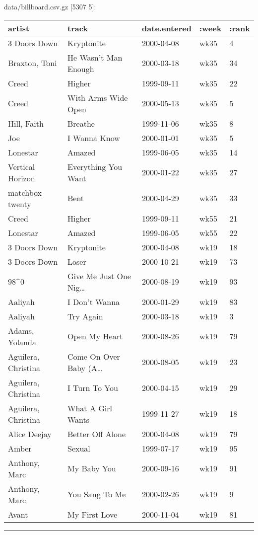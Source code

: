 \documentclass[]{article}
\newenvironment{Shaded}{\begin{snugshade}}{\end{snugshade}}
\newcommand{\StringTok}[1]{\textcolor[rgb]{0.31,0.60,0.02}{#1}}
\newcommand{\VariableTok}[1]{\textcolor[rgb]{0.00,0.00,0.00}{#1}}
\newcommand{\AttributeTok}[1]{\textcolor[rgb]{0.77,0.63,0.00}{#1}}
\newcommand{\NormalTok}[1]{#1}
\begin{document}
\begin{Shaded}
\end{Shaded}

data/billboard.csv.gz {[}5307 5{]}:

\begin{longtable}[]{@{}lllll@{}}
\toprule
artist & track & date.entered & :week & :rank\tabularnewline
\midrule
\endhead
3 Doors Down & Kryptonite & 2000-04-08 & wk35 & 4\tabularnewline
Braxton, Toni & He Wasn't Man Enough & 2000-03-18 & wk35 &
34\tabularnewline
Creed & Higher & 1999-09-11 & wk35 & 22\tabularnewline
Creed & With Arms Wide Open & 2000-05-13 & wk35 & 5\tabularnewline
Hill, Faith & Breathe & 1999-11-06 & wk35 & 8\tabularnewline
Joe & I Wanna Know & 2000-01-01 & wk35 & 5\tabularnewline
Lonestar & Amazed & 1999-06-05 & wk35 & 14\tabularnewline
Vertical Horizon & Everything You Want & 2000-01-22 & wk35 &
27\tabularnewline
matchbox twenty & Bent & 2000-04-29 & wk35 & 33\tabularnewline
Creed & Higher & 1999-09-11 & wk55 & 21\tabularnewline
Lonestar & Amazed & 1999-06-05 & wk55 & 22\tabularnewline
3 Doors Down & Kryptonite & 2000-04-08 & wk19 & 18\tabularnewline
3 Doors Down & Loser & 2000-10-21 & wk19 & 73\tabularnewline
98\^{}0 & Give Me Just One Nig\ldots{} & 2000-08-19 & wk19 &
93\tabularnewline
Aaliyah & I Don't Wanna & 2000-01-29 & wk19 & 83\tabularnewline
Aaliyah & Try Again & 2000-03-18 & wk19 & 3\tabularnewline
Adams, Yolanda & Open My Heart & 2000-08-26 & wk19 & 79\tabularnewline
Aguilera, Christina & Come On Over Baby (A\ldots{} & 2000-08-05 & wk19 &
23\tabularnewline
Aguilera, Christina & I Turn To You & 2000-04-15 & wk19 &
29\tabularnewline
Aguilera, Christina & What A Girl Wants & 1999-11-27 & wk19 &
18\tabularnewline
Alice Deejay & Better Off Alone & 2000-04-08 & wk19 & 79\tabularnewline
Amber & Sexual & 1999-07-17 & wk19 & 95\tabularnewline
Anthony, Marc & My Baby You & 2000-09-16 & wk19 & 91\tabularnewline
Anthony, Marc & You Sang To Me & 2000-02-26 & wk19 & 9\tabularnewline
Avant & My First Love & 2000-11-04 & wk19 & 81\tabularnewline
\bottomrule
\end{longtable}

\begin{center}\rule{0.5\linewidth}{0.5pt}\end{center}
\end{document}
